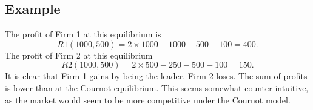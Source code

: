 \documentclass[]{report}
\begin{document}
\subsection{Example}
The profit of Firm 1 at this equilibrium is
\[R1(1000, 500) = 2 × 1000 − 1000 − 500 − 100 = 400.\]
The profit of Firm 2 at this equilibrium
\[R2(1000, 500) = 2 × 500 − 250 − 500 − 100 = 150.\]
It is clear that Firm 1 gains by being the leader. Firm 2 loses. The
sum of profits is lower than at the Cournot equilibrium.
This seems somewhat counter-intuitive, as the market would seem
to be more competitive under the Cournot model.
\end{document}
